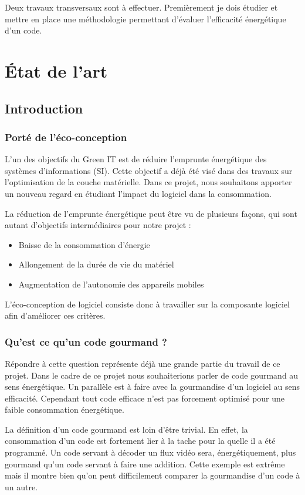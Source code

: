 \documentclass[a4paper, 11pt]{report}
\begin{document}
Deux travaux transversaux sont à effectuer. Premièrement je dois étudier et mettre en place une méthodologie permettant d'évaluer l'efficacité énergétique d'un code.

\chapter{État de l'art}
\section{Introduction}
\subsection{Porté de l'éco-conception}
L’un des objectifs du Green IT est de réduire l’emprunte énergétique des systèmes d’informations (SI). Cette objectif a déjà été visé dans des travaux sur l'optimisation de la couche matérielle. Dans ce projet, nous souhaitons apporter un nouveau regard en étudiant l’impact du logiciel dans la consommation.

La réduction de l’emprunte énergétique peut être vu de plusieurs façons, qui sont autant d’objectifs intermédiaires pour notre projet :
\begin{itemize}
	\item Baisse de la consommation d’énergie
	\item Allongement de la durée de vie du matériel
	\item Augmentation de l’autonomie des appareils mobiles
\end{itemize}

L’éco-conception de logiciel consiste donc à travailler sur la composante logiciel afin d’améliorer ces critères.

\subsection{Qu'est ce qu'un code gourmand ?}
Répondre à cette question représente déjà une grande partie du travail de ce projet. Dans le cadre de ce projet nous souhaiterions parler de code gourmand au sens énergétique. Un parallèle est à faire avec la gourmandise d’un logiciel au sens efficacité. Cependant tout code efficace n’est pas forcement optimisé pour une faible consommation énergétique.

La définition d’un code gourmand est loin d’être trivial. En effet, la consommation d’un code est fortement lier à la tache pour la quelle il a été programmé. Un code servant à décoder un flux vidéo sera, énergétiquement, plus gourmand qu’un code servant à faire une addition. Cette exemple est extrême mais il montre bien qu’on peut difficilement comparer la gourmandise d’un code à un autre.
\end{document}
